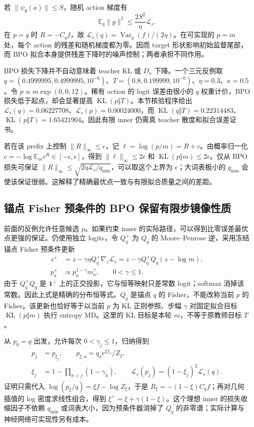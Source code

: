 \documentclass[lang=cn,scheme=chinese,openany]{../book/elegantbook}
\newcommand{\E}{\mathbb E}
\newcommand{\KL}{\operatorname{KL}}
\newcommand{\Var}{\operatorname{Var}}
\begin{document}
若 $\|\psi_\theta(a)\|\le S$，随机 action 梯度有
\begin{equation}
 \E_q\|g\|^2\le\frac{2S^2}{\eta}\mathcal L_s.
\end{equation}
在 $p=q$ 时 $R=-C_qf$，故 $\mathcal L_s(q)=\Var_q(f)/(2\eta)$。在可实现的 $p=m$ 处，每个 action 的残差和随机梯度都为零。因而 target 形状影响初始监督尾部，而 BPO 拟合本身提供残差下降时的噪声控制；两者承担不同作用。

BPO 损失下降并不自动意味着 teacher KL 或 $D_\kappa$ 下降。一个三元反例取 $q=(0.4999995,0.4999995,10^{-6})$、$T=(0.8,0.199999,10^{-6})$、$\eta=0.3$、$\kappa=0.5$。令 $p\propto m\exp(0,0,12)$。稀有 action 的 logit 误差由很小的 $q$ 权重计价，BPO 损失低于起点，却会显著提高 $\KL(p\Vert T)$。本节核验程序给出 $\mathcal L_s(q)=0.06227708$、$\mathcal L_s(p)=0.00024000$，而 $\KL(q\Vert T)=0.22314483$、$\KL(p\Vert T)=1.65421904$。因此有限 inner 仍需真 teacher 散度和拟合误差证书。

若在该 prefix 上控制 $\|R\|_\infty\le\epsilon$，记 $\ell=\log(p/m)=R+c$。由概率归一化 $c=-\log\E_me^R\in[-\epsilon,\epsilon]$，得到 $\|\ell\|_\infty\le2\epsilon$ 和 $\KL(p\Vert m)\le2\epsilon$。仅从 BPO 损失可保证 $\|R\|_\infty\le\sqrt{2\eta\mathcal L_s/q_{\min}}$，可以取这个上界为 $\epsilon$；大词表极小的 $q_{\min}$ 会使该保证很弱。这解释了精确最优点一致与有限拟合质量之间的差距。
\subsection{锚点 Fisher 预条件的 BPO 保留有限步镜像性质}

前面的反例允许任意候选 $p$。如果约束 inner 的实际路径，可以得到比零误差最优点更强的保证。仍使用独立 logits，令 $Q_q^+$ 为 $Q_q$ 的 Moore--Penrose 逆，采用冻结锚点 Fisher 预条件更新
\begin{align}
 z^+&=z-\gamma\eta Q_q^+\nabla_z\mathcal L_s
     =z-\gamma Q_q^+Q_q(z-\log m),\\
 p^+_a&\propto p_a^{1-\gamma}m_a^\gamma,\qquad 0<\gamma\le1.
 \label{eq:power-bpo-anchor-fisher-step}
\end{align}
由于 $Q_q^+Q_q$ 是 $\boldsymbol1^\perp$ 上的正交投影，它与恒等映射只差常数 logit；softmax 消掉该常数。因此上式是精确的分布恒等式。$Q_q$ 是锚点 $q$ 的 Fisher，不能改称当前 $p$ 的 Fisher。该更新也恰好等于以当前 $p$ 为 KL 正则参照、步幅 $\gamma$ 对固定拟合目标 $\KL(p\Vert m)$ 执行 entropy MD。这里的 KL 目标是本轮 $m$，不等于原教师目标 $T$。

从 $p_0=q$ 出发，允许每次 $0<\gamma_j\le1$，归纳得到
\begin{align}
 p_j&=p_{\xi_j},\qquad
 p_{\xi,a}=q_ae^{\xi f_a}/Z_\xi,\\
 \xi_j&=1-\prod_{h<j}(1-\gamma_h),\qquad
 \mathcal L_s(p_j)=(1-\xi_j)^2\mathcal L_s(q).
 \label{eq:power-bpo-finite-inner-path}
\end{align}
证明只需代入 $\log(p_\xi/q)=\xi f-\log Z_\xi$，于是 $R_\xi=-(1-\xi)C_qf$；再对几何插值的 log 密度求线性组合，得到 $\xi^+=\xi+\gamma(1-\xi)$。这个理想 inner 的损失收缩因子不依赖 $q_{\min}$ 或词表大小，因为预条件器消掉了 $Q_q$ 的非零谱；实际计算与神经网络可实现性另有成本。
\end{document}
